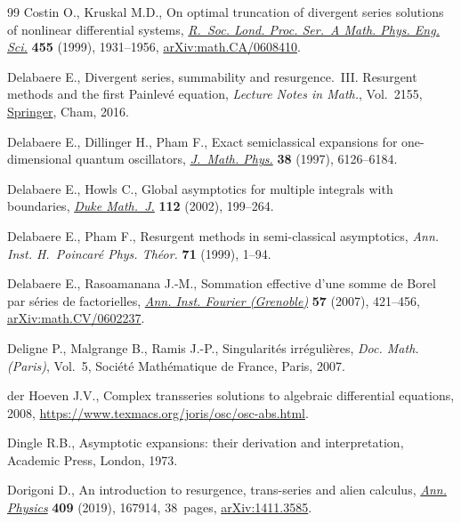 \documentclass[10pt,a4paper]{amsart}
\numberwithin{equation}{section}
\begin{document}
\begin{thebibliography}{99}
Costin O., Kruskal M.D., On optimal truncation of divergent series solutions of
 nonlinear differential systems,
 \href{https://doi.org/10.1098/rspa.1999.0387}{\textit{R.~Soc. Lond. Proc.
 Ser.~A Math. Phys. Eng. Sci.}} \textbf{455} (1999), 1931--1956,
 \href{http://arxiv.org/abs/math.CA/0608410}{arXiv:math.CA/0608410}.

Delabaere E., Divergent series, summability and resurgence.~{III}. {R}esurgent methods and the first Painlev\'e equation,
 \textit{Lecture Notes in Math.}, Vol.~2155,
 \href{https://doi.org/10.1007/978-3-319-29000-3}{Springer}, Cham, 2016.

Delabaere E., Dillinger H., Pham F., Exact semiclassical expansions for
 one-dimensional quantum oscillators,
 \href{https://doi.org/10.1063/1.532206}{\textit{J.~Math. Phys.}} \textbf{38}
 (1997), 6126--6184.

Delabaere E., Howls C., Global asymptotics for multiple integrals with
 boundaries, \href{https://doi.org/10.1215/S0012-9074-02-11221-6}{\textit{Duke
 Math.~J.}} \textbf{112} (2002), 199--264.

Delabaere E., Pham F., Resurgent methods in semi-classical asymptotics,
 \textit{Ann. Inst. H.~Poincar\'e Phys. Th\'eor.} \textbf{71} (1999), 1--94.

Delabaere E., Rasoamanana J.-M., Sommation effective d'une somme de {B}orel par
 s\'eries de factorielles,
 \href{https://doi.org/10.5802/aif.2263}{\textit{Ann. Inst. Fourier
 (Grenoble)}} \textbf{57} (2007), 421--456,
 \href{http://arxiv.org/abs/math.CV/0602237}{arXiv:math.CV/0602237}.

Deligne P., Malgrange B., Ramis J.-P., Singularit\'es irr\'eguli\`eres,
 \textit{Doc. Math. (Paris)}, Vol.~5, Soci\'et\'e Math\'ematique de France,
 Paris, 2007.

der Hoeven J.V., Complex transseries solutions to algebraic differential
 equations, 2008, \url{https://www.texmacs.org/joris/osc/osc-abs.html}.

Dingle R.B., Asymptotic expansions: their derivation and interpretation,
Academic Press, London, 1973.

Dorigoni D., An introduction to resurgence, trans-series and alien calculus,
 \href{https://doi.org/10.1016/j.aop.2019.167914}{\textit{Ann. Physics}}
 \textbf{409} (2019), 167914, 38~pages,
 \href{http://arxiv.org/abs/1411.3585}{arXiv:1411.3585}.


\end{thebibliography}
\end{document}
